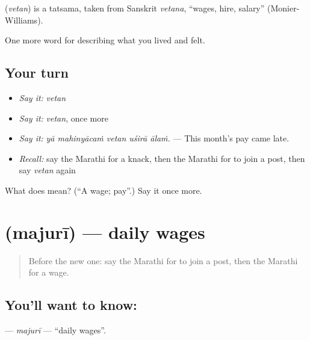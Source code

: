 \begin{cousinweb}
\textbf{} (\emph{vetan}) is a tatsama, taken from Sanskrit \emph{vetana}, \textquotedblleft{}wages, hire, salary\textquotedblright{} (Monier-Williams).
\end{cousinweb}

\begin{grammarlens}[title={What you've built}]
One more word for describing what you lived and felt.
\end{grammarlens}

\subsection*{Your turn}
\begin{itemize}
\raggedright
  \item \emph{Say it:} \emph{vetan}
  \item \emph{Say it:} \emph{vetan}, once more
  \item \emph{Say it:} \emph{yā mahinyācaṁ vetan uśirā ālaṁ.} — This month's pay came late.
  \item \emph{Recall:} say the Marathi for a knack, then the Marathi for to join a post, then say \emph{vetan} again
\end{itemize}

\begin{tcolorbox}[breakable,colback=teal!4,colframe=teal!35!black,title={Before you move on}]
What does  mean? (\textquotedblleft{}A wage; pay\textquotedblright{}.) Say it once more.
\end{tcolorbox}
\section[\texorpdfstring{\mr{मजुरी} (majurī)}{मजुरी (majurī)}]{ (majurī) — daily wages}

\label{lesson:MR-C508-majuri}



\begin{quote}
Before the new one: say the Marathi for to join a post, then the Marathi for a wage.
\end{quote}

\subsection*{You'll want to know: }
\textbf{} — \emph{majurī} — \textquotedblleft{}daily wages\textquotedblright{}.

